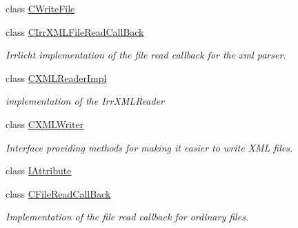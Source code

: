 \begin{DoxyCompactItemize}
class \hyperlink{classirr_1_1io_1_1_c_write_file}{C\-Write\-File}
\item 
class \hyperlink{classirr_1_1io_1_1_c_irr_x_m_l_file_read_call_back}{C\-Irr\-X\-M\-L\-File\-Read\-Call\-Back}
\begin{DoxyCompactList}\small\item\em Irrlicht implementation of the file read callback for the xml parser. \end{DoxyCompactList}\item 
class \hyperlink{classirr_1_1io_1_1_c_x_m_l_reader_impl}{C\-X\-M\-L\-Reader\-Impl}
\begin{DoxyCompactList}\small\item\em implementation of the Irr\-X\-M\-L\-Reader \end{DoxyCompactList}\item 
class \hyperlink{classirr_1_1io_1_1_c_x_m_l_writer}{C\-X\-M\-L\-Writer}
\begin{DoxyCompactList}\small\item\em Interface providing methods for making it easier to write X\-M\-L files. \end{DoxyCompactList}\item 
class \hyperlink{classirr_1_1io_1_1_i_attribute}{I\-Attribute}
\item 
class \hyperlink{classirr_1_1io_1_1_c_file_read_call_back}{C\-File\-Read\-Call\-Back}
\begin{DoxyCompactList}\small\item\em Implementation of the file read callback for ordinary files. \end{DoxyCompactList}\end{DoxyCompactItemize}
